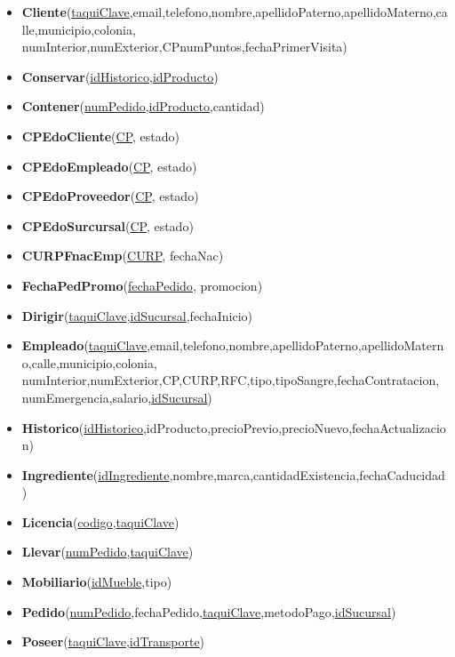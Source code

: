 \documentclass[11pt,letterpaper]{article}
\begin{document}
\begin{itemize}
\item \footnotesize{\textbf{Cliente}(\underline{taquiClave},email,telefono,nombre,apellidoPaterno,apellidoMaterno,calle,municipio,colonia,
numInterior,numExterior,CPnumPuntos,fechaPrimerVisita)}
\item \footnotesize{\textbf{Conservar}(\underline{idHistorico},\underline{idProducto})}
\item \footnotesize{\textbf{Contener}(\underline{numPedido},\underline{idProducto},cantidad)}
\item {\footnotesize \textbf{CPEdoCliente}(\underline{CP}, estado)}
\item {\footnotesize \textbf{CPEdoEmpleado}(\underline{CP}, estado)} 
\item {\footnotesize \textbf{CPEdoProveedor}(\underline{CP}, estado) }
\item {\footnotesize \textbf{CPEdoSurcursal}(\underline{CP}, estado)}
\item{\footnotesize  \textbf{CURPFnacEmp}(\underline{CURP}, fechaNac) }
\item{\footnotesize  \textbf{FechaPedPromo}(\underline{fechaPedido}, promocion) }
\item \footnotesize{\textbf{Dirigir}(\underline{taquiClave},\underline{idSucursal},fechaInicio)}
\item \footnotesize{\textbf{Empleado}(\underline{taquiClave},email,telefono,nombre,apellidoPaterno,apellidoMaterno,calle,municipio,colonia,
numInterior,numExterior,CP,CURP,RFC,tipo,tipoSangre,fechaContratacion,
numEmergencia,salario,\underline{idSucursal})}
\item \footnotesize{\textbf{Historico}(\underline{idHistorico},idProducto,precioPrevio,precioNuevo,fechaActualizacion)}
\item \footnotesize{\textbf{Ingrediente}(\underline{idIngrediente},nombre,marca,cantidadExistencia,fechaCaducidad)}
\item \footnotesize{\textbf{Licencia}(\underline{codigo},\underline{taquiClave}})
\item \footnotesize{\textbf{Llevar}(\underline{numPedido},\underline{taquiClave})}
\item \footnotesize{\textbf{Mobiliario}(\underline{idMueble},tipo)}
\item \footnotesize{\textbf{Pedido}(\underline{numPedido},fechaPedido,\underline{taquiClave},metodoPago,\underline{idSucursal})}
\item \footnotesize{\textbf{Poseer}(\underline{taquiClave},\underline{idTransporte})}

\end{itemize}
\end{document}
